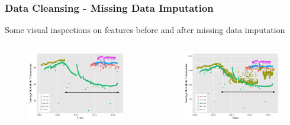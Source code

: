 \documentclass[xcolor=table]{beamer}
\begin{document}
\begin{frame}
\frametitle{Data Cleansing - Missing Data Imputation}
\begin{block}{}
Some visual inspections on features before and after missing data imputation
\end{block}

\begin{columns}[c]
\begin{figure}
\includegraphics[width=1\linewidth,left]{adt_t_copy.png} 
\end{figure}

\begin{figure}
\includegraphics[width=1\linewidth, right]{pre_adt_t.png}
\end{figure}
\end{columns}

\end{frame}
\end{document}
